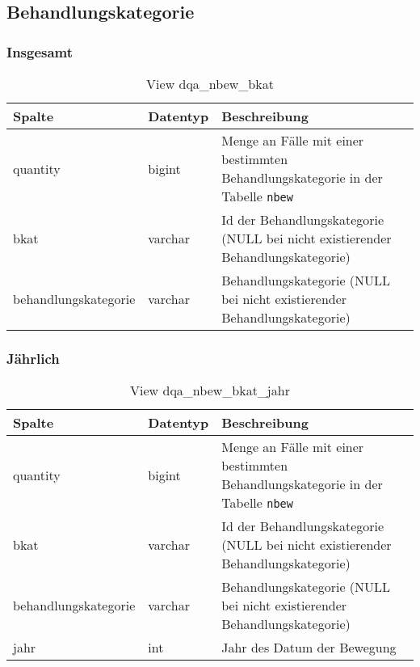 \subsection{Behandlungskategorie} \label{subsec:behKat}

\subsubsection{Insgesamt} \label{subsubsec:behKatI}

\begin{table}[ht]
	\centering   
	\caption{View dqa\_nbew\_bkat}
	\label{tab:beweBkatAll}
	\begin{tabular}{||l|l|p{10cm}||}   		
		\hline
		Spalte & Datentyp & Beschreibung \\ [0.5ex]
		\hline\hline
		quantity & bigint & Menge an Fälle mit einer bestimmten Behandlungskategorie in der Tabelle \texttt{nbew} \\
		\hline
		bkat & varchar & Id der Behandlungskategorie (NULL bei nicht existierender Behandlungskategorie)\\
		\hline
		behandlungskategorie & varchar & Behandlungskategorie (NULL bei nicht existierender Behandlungskategorie)\\
		\hline
		
	\end{tabular}
\end{table}

\subsubsection{Jährlich} \label{subsubsec:behKatJ}

\begin{table}[ht]
	\centering   
	\caption{View dqa\_nbew\_bkat\_jahr}
	\label{tab:beweBkatJahr}
	\begin{tabular}{||l|l|p{10cm}||}   		
		\hline
		Spalte & Datentyp & Beschreibung \\ [0.5ex]
		\hline\hline
		quantity & bigint & Menge an Fälle mit einer bestimmten Behandlungskategorie in der Tabelle \texttt{nbew} \\
		\hline
		bkat & varchar & Id der Behandlungskategorie (NULL bei nicht existierender Behandlungskategorie)\\
		\hline
		behandlungskategorie & varchar & Behandlungskategorie (NULL bei nicht existierender Behandlungskategorie)\\
		\hline
		jahr & int &  Jahr des Datum der Bewegung \\
		\hline
		
	\end{tabular}
\end{table}
\newpage
